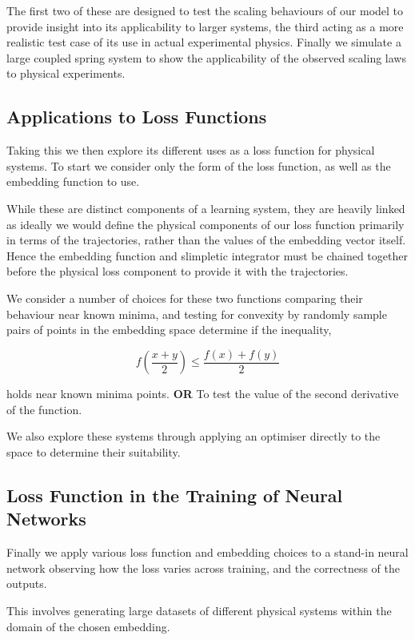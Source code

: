 The first two of these are designed to test the scaling behaviours of our model to provide insight into its applicability to larger systems, the third acting as a more realistic test case of its use in actual experimental physics. Finally we simulate a large coupled spring system to show the applicability of the observed scaling laws to physical experiments.

\subsection{Applications to Loss Functions}

Taking this \updimpl{} we then explore its different uses as a loss function for physical systems. To start we consider only the form of the loss function, as well as the embedding function to use.


While these are distinct components of a learning system, they are heavily linked as ideally we would define the physical components of our loss function primarily in terms of the trajectories, rather than the values of the embedding vector itself. Hence the embedding function and slimpletic integrator must be chained together before the physical loss component to provide it with the trajectories.

We consider a number of choices for these two functions comparing their behaviour near known minima, and testing for convexity by randomly sample pairs of points in the embedding space determine if the inequality,

\begin{equation}
  f\left(\frac{x+y}{2}\right) \le \frac{f(x)+f(y)}{2}
\end{equation}

holds near known minima points. \textbf{OR} To test the value of the second derivative of the function.

We also explore these systems through applying an optimiser directly to the space to determine their suitability.


\subsection{Loss Function in the Training of Neural Networks}

Finally we apply various loss function and embedding choices to a stand-in neural network observing how the loss varies across training, and the correctness of the outputs.

This involves generating large datasets of different physical systems within the domain of the chosen embedding.


